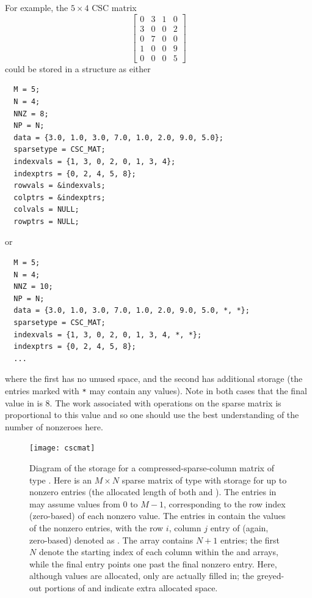 For example, the $5\times 4$ CSC matrix
\[
  \left[\begin{array}{cccc} 
     0 & 3 & 1 & 0\\
     3 & 0 & 0 & 2\\
     0 & 7 & 0 & 0\\
     1 & 0 & 0 & 9\\
     0 & 0 & 0 & 5
  \end{array}\right]
\]
could be stored in a  structure as either
\begin{verbatim}
  M = 5;
  N = 4;
  NNZ = 8;
  NP = N;
  data = {3.0, 1.0, 3.0, 7.0, 1.0, 2.0, 9.0, 5.0};
  sparsetype = CSC_MAT;
  indexvals = {1, 3, 0, 2, 0, 1, 3, 4};
  indexptrs = {0, 2, 4, 5, 8};
  rowvals = &indexvals;
  colptrs = &indexptrs;
  colvals = NULL;
  rowptrs = NULL;
\end{verbatim}
or 
\begin{verbatim}
  M = 5;
  N = 4;
  NNZ = 10;
  NP = N;
  data = {3.0, 1.0, 3.0, 7.0, 1.0, 2.0, 9.0, 5.0, *, *};
  sparsetype = CSC_MAT;
  indexvals = {1, 3, 0, 2, 0, 1, 3, 4, *, *};
  indexptrs = {0, 2, 4, 5, 8};
  ...
\end{verbatim}
where the first has no unused space, and the second has additional
storage (the entries marked with \texttt{*} may contain any values).
Note in both cases that the final value in  is $8$.  The work 
associated with operations on the sparse matrix is proportional to this
value and so one should use the best understanding of the
number of nonzeroes here.
\begin{figure}
\centerline{\texttt{[image: cscmat]}}
\caption[Diagram of the storage for a compressed-sparse-column matrix
  of type ] 
  {Diagram of the storage for a compressed-sparse-column matrix of
  type . Here  is an $M \times N$ sparse matrix of
  type  with storage for up to  nonzero entries
  (the allocated length of both  and ).  The
  entries in  may assume values from $0$ to $M-1$,
  corresponding to the row index (zero-based) of each nonzero value.
  The entries in  contain the values of the nonzero entries,
  with the row $i$, column $j$ entry of  (again, zero-based)
  denoted as .  The  array contains $N+1$
  entries; the first $N$ denote the starting index of each column
  within the  and  arrays, while the final entry
  points one past the final nonzero entry.  Here, although 
  values are allocated, only  are actually filled in; the
  greyed-out portions of  and  indicate extra
  allocated space.}\label{f:cscmat}
\end{figure}


